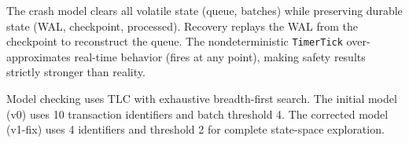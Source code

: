 The crash model clears all volatile state (queue, batches) while preserving
durable state (WAL, checkpoint, processed). Recovery replays the WAL from the
checkpoint to reconstruct the queue. The nondeterministic \texttt{TimerTick}
over-approximates real-time behavior (fires at any point), making safety
results strictly stronger than reality.

Model checking uses TLC with exhaustive breadth-first search. The initial
model (v0) uses 10 transaction identifiers and batch threshold 4. The
corrected model (v1-fix) uses 4 identifiers and threshold 2 for complete
state-space exploration.
